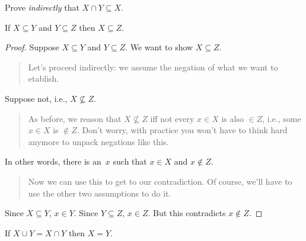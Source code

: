 \documentclass[../../../include/open-logic-section]{subfiles}
\begin{document}
\begin{prob}
Prove \emph{indirectly} that $X \cap Y \subseteq X$.
\end{prob}

\begin{prop}
If $X \subseteq Y$ and $Y \subseteq Z$ then $X \subseteq Z$.
\end{prop}

\begin{proof}
  Suppose $X \subseteq Y$ and $Y \subseteq Z$. We want to show $X
  \subseteq Z$.
  \begin{quote}
    Let's proceed indirectly: we assume the negation of what we want
    to etablish.
  \end{quote}
  Suppose not, i.e., $X \nsubseteq Z$.
  \begin{quote}
    As before, we reason that $X \nsubseteq Z$ iff not every $x \in X$
    is also $\in Z$, i.e., some $x \in X$ is $\notin Z$.  Don't worry,
    with practice you won't have to think hard anymore to unpack
    negations like this.
  \end{quote}
  In other words, there is an~$x$ such that $x \in X$ and $x \notin Z$.
  \begin{quote}
    Now we can use this to get to our contradiction. Of course, we'll
    have to use the other two assumptions to do it.
  \end{quote}
  Since $X \subseteq Y$, $x \in Y$. Since $Y \subseteq Z$, $x \in
  Z$. But this contradicts $x \notin Z$.
\end{proof}

\begin{prop}
If $X \cup Y = X \cap Y$ then $X = Y$.
\end{prop}
\end{document}
